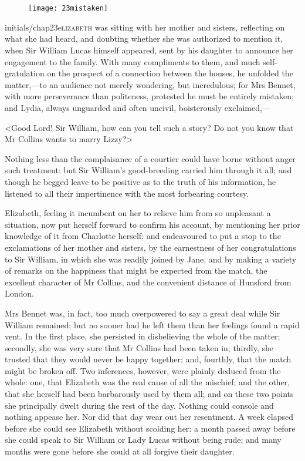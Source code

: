 \chapter[Chapter \thechapter]{}
	
\begin{figure}[t!]
\centering
\texttt{[image: 23mistaken]}
\end{figure}

\lettrine[lines=6,image=true]{initials/chap23e}{lizabeth}  was sitting with her mother and sisters, reflecting on what she had heard, and doubting whether she was authorized to mention it, when Sir William Lucas himself appeared, sent by his daughter to announce her engagement to the family. With many compliments to them, and much self-gratulation on the prospect of a connection between the houses, he unfolded the matter,—to an audience not merely wondering, but incredulous; for Mrs Bennet, with more perseverance than politeness, protested he must be entirely mistaken; and Lydia, always unguarded and often uncivil, boisterously exclaimed,—

<Good Lord! Sir William, how can you tell such a story? Do not you know that Mr Collins wants to marry Lizzy?>

Nothing less than the complaisance of a courtier could have borne without anger such treatment: but Sir William's good-breeding carried him through it all; and though he begged leave to be positive as to the truth of his information, he listened to all their impertinence with the most forbearing courtesy.

Elizabeth, feeling it incumbent on her to relieve him from so unpleasant a situation, now put herself forward to confirm his account, by mentioning her prior knowledge of it from Charlotte herself; and endeavoured to put a stop to the exclamations of her mother and sisters, by the earnestness of her congratulations to Sir William, in which she was readily joined by Jane, and by making a variety of remarks on the happiness that might be expected from the match, the excellent character of Mr Collins, and the convenient distance of Hunsford from London.

Mrs Bennet was, in fact, too much overpowered to say a great deal while Sir William remained; but no sooner had he left them than her feelings found a rapid vent. In the first place, she persisted in disbelieving the whole of the matter; secondly, she was very sure that Mr Collins had been taken in; thirdly, she trusted that they would never be happy together; and, fourthly, that the match might be broken off. Two inferences, however, were plainly deduced from the whole: one, that Elizabeth was the real cause of all the mischief; and the other, that she herself had been barbarously used by them all; and on these two points she principally dwelt during the rest of the day. Nothing could console and nothing appease her. Nor did that day wear out her resentment. A week elapsed before she could see Elizabeth without scolding her: a month passed away before she could speak to Sir William or Lady Lucas without being rude; and many months were gone before she could at all forgive their daughter.

